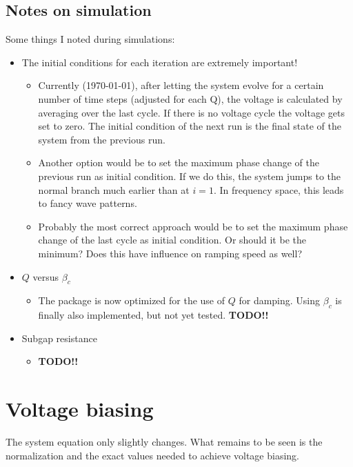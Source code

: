 \documentclass[reprint,onecolumn,%
amsmath,amssymb,aip,apl]{revtex4-1}
\begin{document}
	\subsection{Notes on simulation}
	Some things I noted during simulations:
	\begin{itemize}
		\item The initial conditions for each iteration are extremely important!
		\begin{itemize}
			\item Currently (\today), after letting the system evolve for a certain number of time steps (adjusted for each Q), the voltage is calculated by averaging over the last cycle.
			If there is no voltage cycle the voltage gets set to zero.
			The initial condition of the next run is the final state of the system from the previous run.
			\item Another option would be to set the maximum phase change of the previous run as initial condition.
			If we do this, the system jumps to the normal branch much earlier than at $i=1$.
			In frequency space, this leads to fancy wave patterns.
			\item Probably the most correct approach would be to set the maximum phase change of the last cycle as initial condition.
			Or should it be the minimum?
			Does this have influence on ramping speed as well?
		\end{itemize}
		
		\item $Q$ versus $\beta_c$
		\begin{itemize}
			\item The package is now optimized for the use of $Q$ for damping.
			Using $\beta_c$ is finally also implemented, but not yet tested. \textbf{TODO!!}
		\end{itemize}
		\item Subgap resistance
		\begin{itemize}
			\item \textbf{TODO!!}
		\end{itemize}
	\end{itemize}
	
	\section{Voltage biasing}
	The system equation only slightly changes.
	What remains to be seen is the normalization and the exact values needed to achieve voltage biasing.
	
	
	
\end{document}
